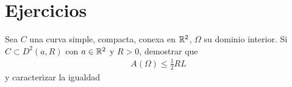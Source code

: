 \section{Ejercicios}

\begin{ejercicio}
    Sea $C$ una curva simple, compacta, conexa en $\mathbb{R}^2$, $\Omega$ su dominio interior. Si $C\subset D^2(a,R)$ con $a\in \mathbb{R}^2$ y $R>0$, demostrar que 
    \begin{gather*}
        A(\Omega) \leq \frac{1}{2} RL
    \end{gather*}
    y caracterizar la igualdad
\end{ejercicio}



